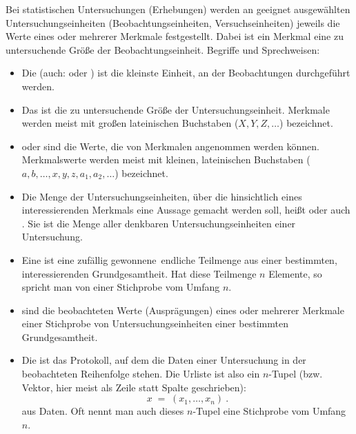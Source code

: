 \begin{MIntro}

Bei statistischen Untersuchungen (Erhebungen) werden an geeignet ausgewählten Untersuchungseinheiten (Beobachtungseinheiten, Versuchseinheiten) jeweils die Werte eines oder mehrerer Merkmale festgestellt. Dabei ist ein Merkmal eine zu untersuchende Größe der Beobachtungseinheit.
Begriffe und Sprechweisen:
\begin{itemize}
\item{Die  (auch:  oder )
ist die kleinste Einheit, an der Beobachtungen durchgeführt werden.}
\item{Das  ist die zu untersuchende Größe der Untersuchungseinheit. Merkmale werden meist mit großen lateinischen Buchstaben ($X, Y, Z, \ldots$)
bezeichnet.}
\item{ oder  sind die Werte, die von Merkmalen angenommen werden können.
Merkmalswerte werden meist mit kleinen, lateinischen Buchstaben ($a, b,\ldots, x, y, z, a_1, a_2,\ldots$) bezeichnet.}
\item{Die Menge der Untersuchungseinheiten, über die hinsichtlich eines interessierenden Merkmals eine Aussage gemacht werden soll,
heißt  oder auch . Sie ist die Menge aller denkbaren Untersuchungseinheiten einer Untersuchung.}
\item{Eine  ist eine \glqq zufällig gewonnene\grqq\ endliche Teilmenge aus einer bestimmten,
interessierenden Grundgesamtheit. Hat diese Teilmenge $n$ Elemente, so spricht man von einer \glqq Stichprobe vom Umfang $n$\grqq.}
\item{ sind die beobachteten Werte (Ausprägungen) eines oder mehrerer Merkmale einer Stichprobe von Untersuchungseinheiten einer bestimmten Grundgesamtheit.}
\item{Die  ist das Protokoll, auf dem die Daten einer Untersuchung in der beobachteten Reihenfolge stehen.
Die Urliste ist also ein $n$-Tupel (bzw. Vektor, hier meist als Zeile statt Spalte geschrieben):
$$
x \;=\; (x_1,\ldots,x_n)\: .
$$
aus Daten. Oft nennt man auch dieses $n$-Tupel eine \glqq Stichprobe vom Umfang $n$\grqq.}
\end{itemize}


\end{MIntro}
